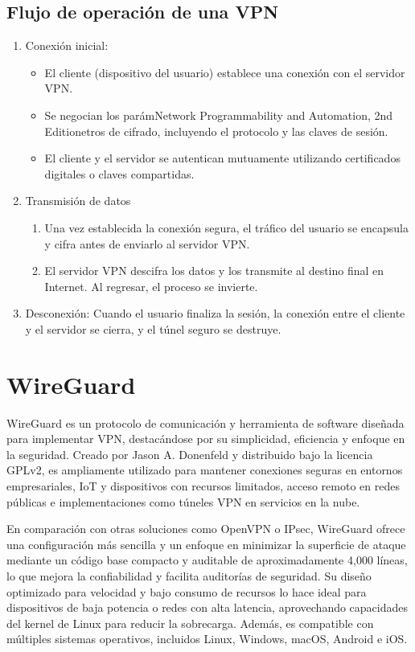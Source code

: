 \subsection{Flujo de operación de una VPN}
\begin{enumerate}
    \item Conexión inicial:
    \begin{itemize}
        \item El cliente (dispositivo del usuario) establece una conexión con el servidor VPN.
        \item Se negocian los parámNetwork Programmability and Automation, 2nd Editionetros de cifrado, incluyendo el protocolo y las claves de sesión.
        \item El cliente y el servidor se autentican mutuamente utilizando certificados digitales o claves compartidas.
    \end{itemize}

   \item Transmisión de datos
        \begin{enumerate}
            \item Una vez establecida la conexión segura, el tráfico del usuario se encapsula y cifra antes de enviarlo al servidor VPN.
            \item El servidor VPN descifra los datos y los transmite al destino final en Internet. Al regresar, el proceso se invierte.
        \end{enumerate}
    \item Desconexión: Cuando el usuario finaliza la sesión, la conexión entre el cliente y el servidor se cierra, y el túnel seguro se destruye.
\end{enumerate}

\section{WireGuard}
    WireGuard es un protocolo de comunicación y herramienta de software diseñada para implementar VPN, destacándose por su simplicidad, eficiencia y enfoque en la seguridad. Creado por Jason A. Donenfeld y distribuido bajo la licencia GPLv2, es ampliamente utilizado para mantener conexiones seguras en entornos empresariales, IoT y dispositivos con recursos limitados, acceso remoto en redes públicas e implementaciones como túneles VPN en servicios en la nube.  

    En comparación con otras soluciones como OpenVPN o IPsec, WireGuard ofrece una configuración más sencilla y un enfoque en minimizar la superficie de ataque mediante un código base compacto y auditable de aproximadamente 4,000 líneas, lo que mejora la confiabilidad y facilita auditorías de seguridad. Su diseño optimizado para velocidad y bajo consumo de recursos lo hace ideal para dispositivos de baja potencia o redes con alta latencia, aprovechando capacidades del kernel de Linux para reducir la sobrecarga. Además, es compatible con múltiples sistemas operativos, incluidos Linux, Windows, macOS, Android e iOS.  

